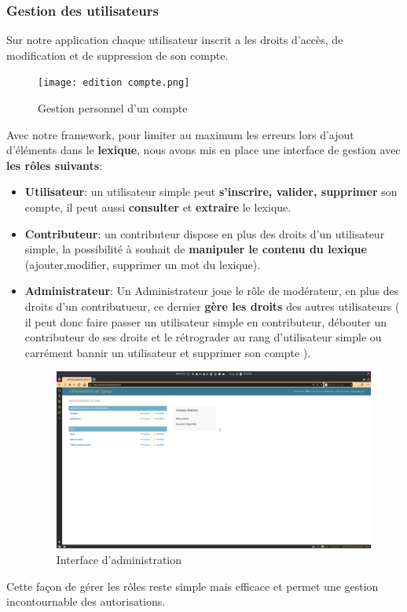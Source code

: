 \documentclass[a4paper, 12pt]{article}
\begin{document}
\subsubsection{Gestion des utilisateurs}
Sur notre application chaque utilisateur inscrit a les droits d'accès, de modification et de suppression de son compte.
\begin{figure}[H] 
    \centering
    \texttt{[image: edition compte.png]}
    \caption{Gestion personnel d'un compte }
\end{figure}
Avec notre framework, pour limiter au maximum les erreurs lors d'ajout d'éléments dans le \textbf{lexique}, nous avons mis en place une interface de gestion avec  \textbf{les rôles suivants}:
\begin{itemize}
\item \textbf{Utilisateur}: un utilisateur simple peut \textbf{s'inscrire, valider, supprimer} son compte, il peut  aussi \textbf{consulter} et \textbf{extraire} le lexique.
\item \textbf{Contributeur}: un contributeur dispose en plus des droits d'un utilisateur simple, la possibilité à souhait de \textbf{manipuler le contenu du lexique} (ajouter,modifier, supprimer un mot du lexique).
\item \textbf{Administrateur}: Un Administrateur joue le rôle de modérateur, en plus des droits d'un contributueur, ce dernier  \textbf{gère les droits} des autres utilisateurs ( il peut donc faire passer un utilisateur simple en contributeur, débouter un contributeur de ses droits et le rétrograder au rang d'utilisateur simple ou carrément bannir un utilisateur et supprimer son compte ).
\begin{figure}[H]
    \centering
    \includegraphics[scale=0.27]{admin.png}
    \caption{Interface d'administration }
\end{figure}
\end{itemize}
Cette façon de gérer les rôles reste simple mais efficace et permet une gestion incontournable des autorisations.
\end{document}
